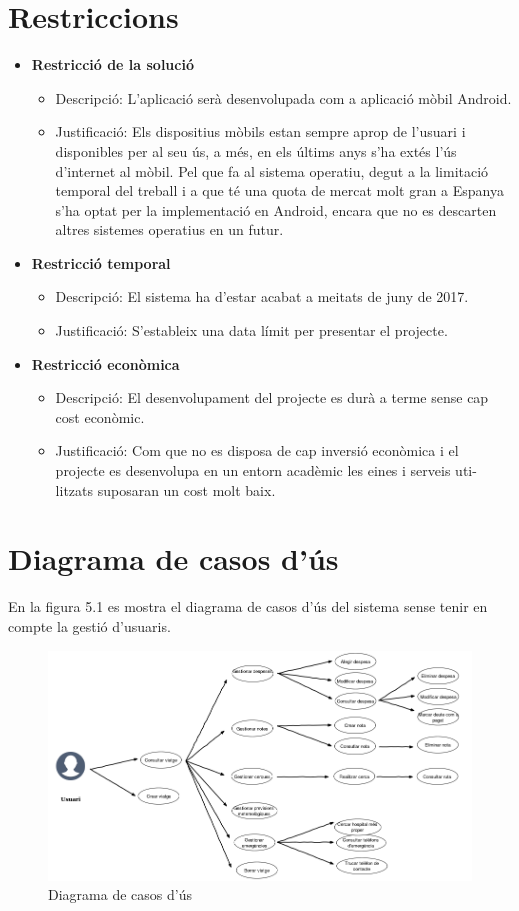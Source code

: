 \section{Restriccions}
\begin{itemize}
\item[]\textbf{Restricció de la solució}
\begin{itemize}
\item{}Descripció: L’aplicació serà desenvolupada com a aplicació mòbil Android.
\item{}Justificació: Els dispositius mòbils estan sempre aprop de l’usuari i
disponibles per al seu ús, a més, en els últims anys s’ha extés l’ús
d’internet al mòbil. Pel que fa al sistema operatiu, degut a la limitació temporal del treball i a que té una quota de mercat molt gran a
Espanya s’ha optat per la implementació en Android, encara que no
es descarten altres sistemes operatius en un futur.
\end{itemize}
\item[]\textbf{Restricció temporal}
\begin{itemize}
\item{}Descripció: El sistema ha d’estar acabat a meitats de juny de 2017.
\item{}Justificació: S’estableix una data límit per presentar el projecte.
\end{itemize}
\item[]\textbf{Restricció econòmica}
\begin{itemize}
\item{}Descripció: El desenvolupament del projecte es durà a terme sense
cap cost econòmic.
\item{}Justificació: Com que no es disposa de cap inversió econòmica i el
projecte es desenvolupa en un entorn acadèmic les eines i serveis uti-
litzats suposaran un cost molt baix.
\end{itemize}
\end{itemize}

\section{Diagrama de casos d'ús}
En la figura 5.1 es mostra el diagrama de casos d’ús del sistema sense tenir en compte la gestió d'usuaris.

\begin{figure}[!h]
\centering
\includegraphics[scale=0.65]{Figures/casosUs.png}
\caption{Diagrama de casos d'ús}
\end{figure}

